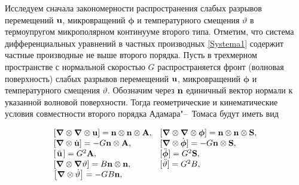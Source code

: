
Исследуем сначала закономерности распространения  слабых разрывов перемещений  ${\bf u}$, микровращений ${\boldsymbol\phi}$ и температурного смещения $\vartheta$ в термоупругом микрополярном континууме второго типа. Отметим, что система дифференциальных уравнений в частных производных \eqref{Systema1} содержит частные производные не выше второго порядка. Пусть в трехмерном пространстве с нормальной скоростью $G$ распространяется фронт (волновая поверхность) слабых разрывов перемещений  ${\bf u}$, микровращений ${\boldsymbol\phi}$ и температурного смещения $\vartheta$. Обозначим через $\bf{n}$ единичный вектор нормали к указанной волновой поверхности. Тогда геометрические и кинематические условия совместности второго порядка Адамара"--~Томаса \cite{MurashkinRadayev:bib:Thomas} будут иметь вид

\begin{equation}

\begin{array}{ll}

\left[ {{\boldsymbol\nabla}  \otimes {\boldsymbol\nabla}  \otimes {\bf u}} \right] = {\bf n} \otimes {\bf n} \otimes {\bf A}, &

\left[ {{\boldsymbol\nabla}  \otimes {\boldsymbol\nabla}  \otimes {\boldsymbol\phi}} \right] = {\bf n} \otimes {\bf n} \otimes {\bf S}, \\

 \left[ {{\boldsymbol\nabla} \otimes {\dot{\bf u}}} \right] =  - G{\bf n} \otimes {\bf A}, &

[ {{\boldsymbol\nabla} \otimes {\dot{\boldsymbol\phi}}} ] =  - G{\bf n} \otimes {\bf S}, \\

 {[}\kern1pt{\ddot{\bf u}}\kern1pt{]} = G^2 {\bf A}, &  [{\ddot{\boldsymbol\phi}}] = G^2 {\bf S},\\

 \left[ {{\boldsymbol\nabla}  \otimes {\boldsymbol\nabla}  \vartheta } \right] ={ B} {\bf n} \otimes {\bf n} , &  [{\ddot{\vartheta}}] = G^2 B,\\

\left[ {{\boldsymbol\nabla} \otimes {\dot{\vartheta}}} \right] =  - G B{\bf n}, &

 \\

 \end{array}

\label{Ad_Tom}

\end{equation}

